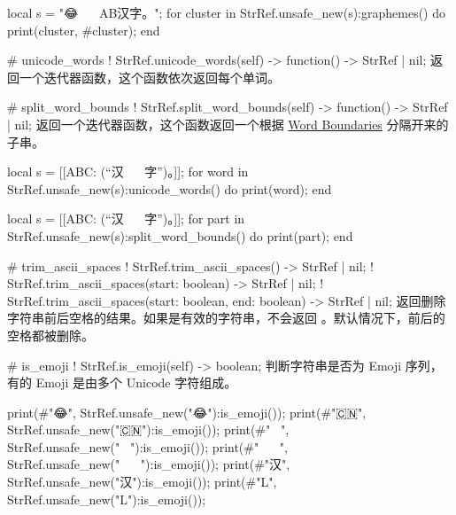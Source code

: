 \documentclass[class=article,doc={kv-usage}]{cusdoc}
\begin{document}
\begin{luarun}{}
local s = "😂👩🏻‍❤️‍💋‍👨🏻AB汉字。";
for cluster in StrRef.unsafe_new(s):graphemes() do
    print(cluster, #cluster);
end
\end{luarun}

\begin{luadoc*}{}
# unicode_words
! StrRef.unicode_words(self) -> function() -> StrRef | nil;
返回一个迭代器函数，这个函数依次返回每个单词。
\end{luadoc*}

\begin{luadoc*}{}
# split_word_bounds
! StrRef.split_word_bounds(self) -> function() -> StrRef | nil;
返回一个迭代器函数，这个函数返回一个根据 \href{https://www.unicode.org/reports/tr29/#Word_Boundaries}{Word Boundaries} 分隔开来的子串。
\end{luadoc*}

\begin{luarun}{}
local s = [[ABC: (“汉👩🏻‍❤️‍💋‍👨🏻字”)。]];
for word in StrRef.unsafe_new(s):unicode_words() do
    print(word);
end
\end{luarun}

\begin{luarun}{}
local s = [[ABC: (“汉👩🏻‍❤️‍💋‍👨🏻字”)。]];
for part in StrRef.unsafe_new(s):split_word_bounds() do
    print(part);
end
\end{luarun}

\begin{luadoc*}{}
# trim_ascii_spaces
! StrRef.trim_ascii_spaces() -> StrRef | nil;
! StrRef.trim_ascii_spaces(start: boolean) -> StrRef | nil;
! StrRef.trim_ascii_spaces(start: boolean, end: boolean) -> StrRef | nil;
返回删除字符串前后空格的结果。如果是有效的字符串，不会返回 。默认情况下，前后的空格都被删除。
\end{luadoc*}

\begin{luadoc*}{}
# is_emoji
! StrRef.is_emoji(self) -> boolean;
判断字符串是否为 Emoji 序列，有的 Emoji 是由多个 Unicode 字符组成。
\end{luadoc*}

\begin{luarun}{}
print(#"😂", StrRef.unsafe_new("😂"):is_emoji());
print(#"🇨🇳", StrRef.unsafe_new("🇨🇳"):is_emoji());
print(#"🤦🏻‍♀️", StrRef.unsafe_new("🤦🏻‍♀️"):is_emoji());
print(#"👩🏻‍❤️‍💋‍👨🏻", StrRef.unsafe_new("👩🏻‍❤️‍💋‍👨🏻"):is_emoji());
print(#"汉", StrRef.unsafe_new("汉"):is_emoji());
print(#"L", StrRef.unsafe_new("L"):is_emoji());
\end{luarun}
\end{document}
